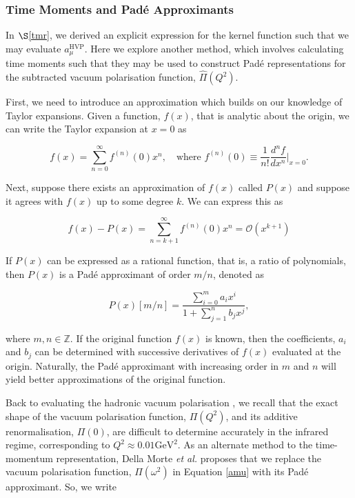\documentclass{article}
\numberwithin{equation}{section} %
\begin{document}
\subsubsection{Time Moments and Pad\'{e} Approximants}\label{moments}

In $\S$\ref{tmr}, we derived an explicit expression for the kernel function such that we may evaluate $a_\mu^{\mathrm{HVP}}$. Here we explore another method, which involves calculating time moments such that they may be used to construct Pad\'{e} representations for the subtracted vacuum polarisation function, $\hat{\Pi}(Q^2)$\cite{dellamorte}.

First, we need to introduce an approximation which builds on our knowledge of Taylor expansions. Given a function, $f(x)$, that is analytic about the origin, we can write the Taylor expansion at $x=0$ as

\begin{equation}
f(x) = \sum_{n=0}^\infty f^{(n)}(0)x^n, \quad \mathrm{where}\,\, f^{(n)}(0) \equiv \frac{1}{n!}\frac{d^nf}{dx^n}\bigg\vert_{x=0}.
\end{equation}

Next, suppose there exists an approximation of $f(x)$ called $P(x)$ and suppose it agrees with $f(x)$ up to some degree $k$\cite{pade}. We can express this as 

\begin{equation}
f(x) - P(x) = \sum_{n=k+1}^\infty f^{(n)}(0)x^n = \mathcal{O}(x^{k+1})
\end{equation}

If $P(x)$ can be expressed as a rational function, that is, a ratio of polynomials, then $P(x)$ is a Pad\'{e} approximant of order $m/n$\cite{pade}, denoted as 

\begin{equation}
P(x)[m/n] = \frac{\sum_{i=0}^ma_ix^i}{1+\sum_{j=1}^nb_jx^j},
\label{pade}
\end{equation}

\noindent where $m,n\in \mathbb{Z}$. If the original function $f(x)$ is known, then the coefficients, $a_i$ and $b_j$ can be determined with successive derivatives of $f(x)$ evaluated at the origin. Naturally, the Pad\'{e} approximant with increasing order in $m$ and $n$ will yield better approximations of the original function.

Back to evaluating the hadronic vacuum polarisation , we recall that the exact shape of the vacuum polarisation function, $\Pi(Q^2)$, and its additive renormalisation, $\Pi(0)$, are difficult to determine accurately in the infrared regime, corresponding to $Q^2 \approx 0.01\mathrm{GeV}^2$\cite{dellamorte}. As an alternate method to the time-momentum representation, Della Morte \textit{et al.}\cite{dellamorte} proposes that we replace the vacuum polarisation function, $\Pi(\omega^2)$ in Equation \ref{amu} with its Pad\'{e} approximant. So, we write
\end{document}
